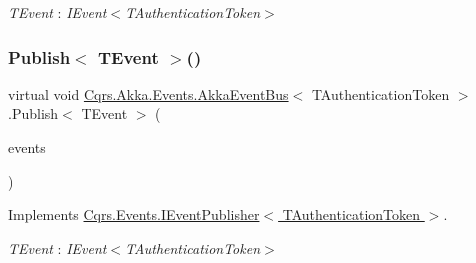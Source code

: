 \begin{Desc}
\item[Type Constraints]\begin{description}
\item[{\em T\+Event} : {\em I\+Event$<$T\+Authentication\+Token$>$}]\end{description}
\end{Desc}
\mbox{\label{classCqrs_1_1Akka_1_1Events_1_1AkkaEventBus_ad5b996dd77efbf51a2b5a32f94417772_ad5b996dd77efbf51a2b5a32f94417772}} 
\subsubsection{\texorpdfstring{Publish$<$ T\+Event $>$()}{Publish< TEvent >()}\hspace{0.1cm}{\footnotesize\ttfamily [2/2]}}
{\footnotesize\ttfamily virtual void \hyperlink{classCqrs_1_1Akka_1_1Events_1_1AkkaEventBus}{Cqrs.\+Akka.\+Events.\+Akka\+Event\+Bus}$<$ T\+Authentication\+Token $>$.Publish$<$ T\+Event $>$ (\begin{DoxyParamCaption}\item[{I\+Enumerable$<$ T\+Event $>$}]{events }\end{DoxyParamCaption})\hspace{0.3cm}{\ttfamily [virtual]}}



Implements \hyperlink{interfaceCqrs_1_1Events_1_1IEventPublisher_a2cbcc3d2c24d015abef6337714ec51ff_a2cbcc3d2c24d015abef6337714ec51ff}{Cqrs.\+Events.\+I\+Event\+Publisher$<$ T\+Authentication\+Token $>$}.

\begin{Desc}
\item[Type Constraints]\begin{description}
\item[{\em T\+Event} : {\em I\+Event$<$T\+Authentication\+Token$>$}]\end{description}
\end{Desc}
\mbox{\label{classCqrs_1_1Akka_1_1Events_1_1AkkaEventBus_a59ec3e497e511b73b5239eee80691443_a59ec3e497e511b73b5239eee80691443}} 
